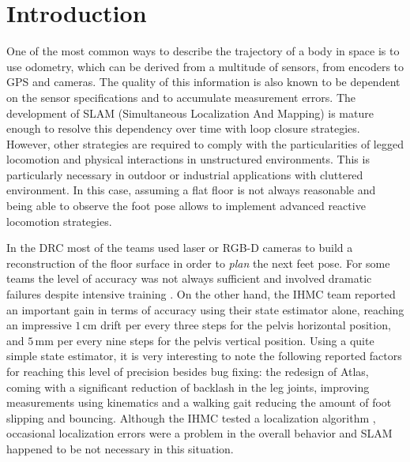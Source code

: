 
\section{Introduction}\label{sec:intro}

One of the most common ways to describe the trajectory of a body in space is to use odometry, which can be derived from a multitude of sensors, from encoders to GPS and cameras.
The quality of this information is also known to be dependent on the sensor specifications and to accumulate measurement errors. 
The development of SLAM (Simultaneous Localization And Mapping) is mature enough to resolve 
this dependency over time with loop closure strategies. However, other strategies are required to comply with the particularities of legged locomotion and physical interactions in unstructured environments. 
This is particularly necessary in outdoor or industrial applications with cluttered environment. 
In this case, assuming a flat floor is not always reasonable and being able to observe the foot pose allows to implement advanced reactive locomotion strategies.

In the DRC \cite{Johnson:jof:2016,Marion:jof:2017,Karumanchi:jof:2017} most of the teams used laser or RGB-D cameras to build a reconstruction of the floor surface in order to \emph{plan}
the next feet pose. For some teams the level of accuracy was not always sufficient and involved dramatic failures despite intensive training \cite{Kaneko:ichr:2015}.
On the other hand, the IHMC team \cite{Johnson:jof:2016} reported an important gain in terms of accuracy using their state estimator alone,
reaching an impressive $1$\,cm drift per every three steps for the pelvis horizontal position,
and $5$\,mm per every nine steps for the pelvis vertical position. 
Using a quite simple state estimator, it is very interesting to note the following reported factors for reaching this level of precision besides bug fixing:
the redesign of Atlas, coming with a significant reduction of backlash in the leg joints, improving measurements using kinematics and a walking gait reducing the amount of foot slipping and bouncing.
Although the IHMC tested a localization algorithm \cite{Pomerlau:ar:2013}, occasional localization errors were a problem in the overall behavior and SLAM happened to be not necessary in this situation.

